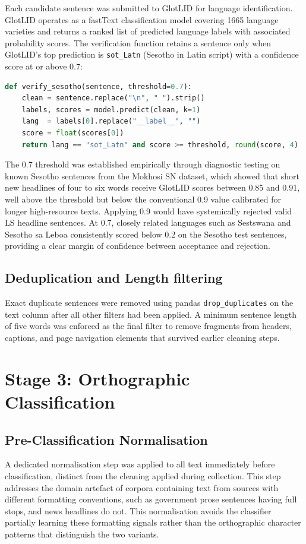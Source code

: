 \documentclass[11pt,a4paper]{article}
\begin{document}
Each candidate sentence was submitted to GlotLID \citep{kargaran2024glotcc} for language identification. GlotLID operates as a fastText classification model covering 1665 language varieties and returns a ranked list of predicted language labels with associated probability scores. The verification function retains a sentence only when GlotLID's top prediction is \texttt{sot\_Latn} (Sesotho in Latin script) with a confidence score at or above 0.7: 

\begin{lstlisting}[language=Python, caption={GlotLID language verification function.}, label={lst:glotlid}]
def verify_sesotho(sentence, threshold=0.7):
    clean = sentence.replace("\n", " ").strip()
    labels, scores = model.predict(clean, k=1)
    lang  = labels[0].replace("__label__", "")
    score = float(scores[0])
    return lang == "sot_Latn" and score >= threshold, round(score, 4)
\end{lstlisting}


The 0.7 threshold was established empirically through diagnostic testing on known Sesotho sentences from the Mokhosi SN dataset, which showed that short new headlines of four to six words receive GlotLID scores between 0.85 and 0.91, well above the threshold but below the conventional 0.9 value calibrated for longer high-resource texts. Applying 0.9 would have systemically rejected valid LS headline sentences. At 0.7, closely related languages such as Sestswana and Sesotho sa Leboa consistently scored below 0.2 on the Sesotho test sentences, providing a clear margin of confidence between acceptance and rejection.

\subsection{Deduplication and Length filtering}

Exact duplicate sentences were removed using pandas \texttt{drop\_duplicates} on the text column after all other filters had been applied. A minimum sentence length of five words was enforced as the final filter to remove fragments from headers, captions, and page navigation elements that survived earlier cleaning steps.


\section{Stage 3: Orthographic Classification}

\subsection{Pre-Classification Normalisation}
A dedicated normalisation step was applied to all text immediately before classification, distinct from the cleaning applied during collection. This step addresses the domain artefact of corpora containing text from sources with different formatting conventions, such as government prose sentences having full stops, and news headlines do not. This normalisation avoids the classifier partially learning these formatting signals rather than the orthographic character patterns that distinguish the two variants.
\end{document}
